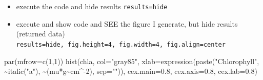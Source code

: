 \documentclass[
]{article}
\newenvironment{Shaded}{\begin{snugshade}}{\end{snugshade}}
\newcommand{\AttributeTok}[1]{\textcolor[rgb]{0.77,0.63,0.00}{#1}}
\newcommand{\DecValTok}[1]{\textcolor[rgb]{0.00,0.00,0.81}{#1}}
\newcommand{\FloatTok}[1]{\textcolor[rgb]{0.00,0.00,0.81}{#1}}
\newcommand{\FunctionTok}[1]{\textcolor[rgb]{0.00,0.00,0.00}{#1}}
\newcommand{\NormalTok}[1]{#1}
\newcommand{\OtherTok}[1]{\textcolor[rgb]{0.56,0.35,0.01}{#1}}
\newcommand{\SpecialCharTok}[1]{\textcolor[rgb]{0.00,0.00,0.00}{#1}}
\newcommand{\StringTok}[1]{\textcolor[rgb]{0.31,0.60,0.02}{#1}}
\providecommand{\tightlist}{%
  \setlength{\itemsep}{0pt}\setlength{\parskip}{0pt}}
\begin{document}
\begin{Shaded}
\end{Shaded}

\begin{itemize}
\tightlist
\item
  execute the code and hide results
  \texttt{results=\textquotesingle{}hide\textquotesingle{}}
\end{itemize}

\begin{Shaded}
\end{Shaded}

\begin{itemize}
\tightlist
\item
  execute and show code and SEE the figure I generate, but hide results
  (returned data)\\
  \texttt{results=\textquotesingle{}hide\textquotesingle{},\ fig.height=4,\ fig.width=4,\ fig.align=\textquotesingle{}center\textquotesingle{}}
\end{itemize}

\begin{Shaded}
\begin{Highlighting}[]
\FunctionTok{par}\NormalTok{(}\AttributeTok{mfrow=}\FunctionTok{c}\NormalTok{(}\DecValTok{1}\NormalTok{,}\DecValTok{1}\NormalTok{))}
\FunctionTok{hist}\NormalTok{(chla, }\AttributeTok{col=}\StringTok{"gray85"}\NormalTok{, }\AttributeTok{xlab=}\FunctionTok{expression}\NormalTok{(}\FunctionTok{paste}\NormalTok{(}\StringTok{"Chlorophyll"}\NormalTok{, }\SpecialCharTok{\textasciitilde{}}\FunctionTok{italic}\NormalTok{(}\StringTok{"a"}\NormalTok{), }\SpecialCharTok{\textasciitilde{}}\NormalTok{(mu}\SpecialCharTok{*}\NormalTok{g}\SpecialCharTok{\textasciitilde{}}\NormalTok{cm}\SpecialCharTok{\^{}{-}}\DecValTok{2}\NormalTok{), }\AttributeTok{sep=}\StringTok{""}\NormalTok{)), }\AttributeTok{cex.main=}\FloatTok{0.8}\NormalTok{, }\AttributeTok{cex.axis=}\FloatTok{0.8}\NormalTok{, }\AttributeTok{cex.lab=}\FloatTok{0.8}\NormalTok{)}
\end{Highlighting}
\end{Shaded}
\end{document}
